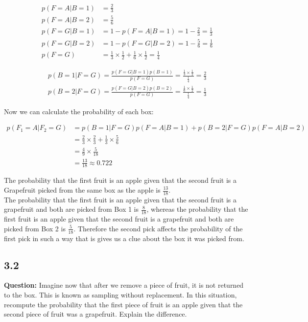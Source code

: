 \documentclass[a4paper]{article}
\begin{document}
\begin{align*}
	p(F = A | B = 1) &= \frac{2}{3}\\
	p(F = A | B = 2) &= \frac{5}{6}\\
	p(F = G | B = 1) &= 1 - p(F = A | B = 1) = 1 - \frac{2}{3} = \frac{1}{3}\\
	p(F = G | B = 2) &= 1 - p(F = G | B = 2) = 1 - \frac{5}{6} = \frac{1}{6}\\
	p(F = G) &= \frac{1}{3} \times \frac{1}{2} + \frac{1}{6} \times \frac{1}{2} = \frac{1}{4}
\end{align*}

\begin{align*}
	p(B = 1 | F = G) = \frac{p(F = G | B = 1)p(B = 1)}{p(F = G)} = \frac{\frac{1}{3} \times \frac{1}{2}}{\frac{1}{4}} = \frac{2}{3}\\
	p(B = 2 | F = G) = \frac{p(F = G | B = 2)p(B = 2)}{p(F = G)} = \frac{\frac{1}{6} \times \frac{1}{2}}{\frac{1}{4}} = \frac{1}{3}
\end{align*}

Now we can calculate the probability of each box:

\begin{align*}
	p(F_1 = A | F_2 = G) &= p(B = 1| F = G)p(F = A | B = 1) + p(B = 2 | F = G)p(F = A | B = 2)\\
	&= \frac{2}{3} \times \frac{2}{3} +  \frac{1}{3} \times \frac{5}{6}	\\
	&= \frac{4}{9} \times \frac{5}{18}\\
	&= \frac{13}{18} \approx 0.722
\end{align*}

The probability that the first fruit is an apple given that the second fruit is a Grapefruit picked from the same box as the apple is $\frac{13}{18}$.\\
The probability that the first fruit is an apple given that the second fruit is a grapefruit and both are picked from Box 1 is $\frac{8}{18}$, whereas the probability that the first fruit is an apple given that the second fruit is a grapefruit and both are picked from Box 2 is $\frac{5}{18}$. Therefore the second pick affects the probability of the first pick in such a way that is gives us a clue about the box it was picked from.

\subsection*{3.2}


\textbf{Question:} Imagine now that after we remove a piece of fruit, it is not returned to the box. This is known as sampling without replacement. In this situation, recompute the probability that the first piece of fruit is an apple given that the second piece of fruit was a grapefruit. Explain the difference.\\
\end{document}
